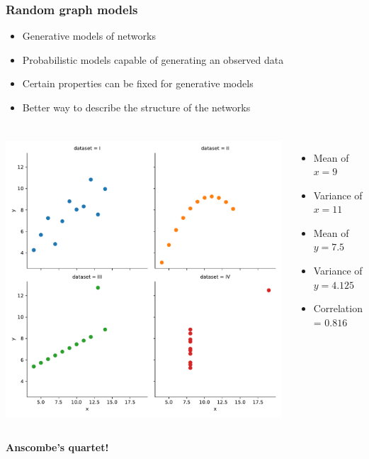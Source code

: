 \documentclass{beamer}
\begin{document}
\begin{frame}
    \frametitle{Random graph models}
    \centering

    \begin{itemize}
    \setlength\itemsep{1em}
        \item{Generative models of networks}
        \item{Probabilistic models capable of generating an observed data}
        \item{Certain properties can be fixed for generative models}
        \item{Better way to describe the structure of the networks}
    \end{itemize}
        
\end{frame}
\begin{frame}
    \frametitle{}
    \begin{columns}
    \centering
    \includegraphics[width=\columnwidth]{anscombe.pdf} 
    
    \pause
    \begin{itemize}
    \setlength\itemsep{1em}
        \item{Mean of $x = 9$}
        \item{Variance of $x = 11$}
        \item{Mean of $y = 7.5$}
        \item{Variance of $y = 4.125$}
        \item{Correlation = $0.816$}
    \end{itemize}
    \end{columns}
    \centering
    \vspace{2em}
    {\bf Anscombe's quartet!}
\end{frame}
\end{document}
